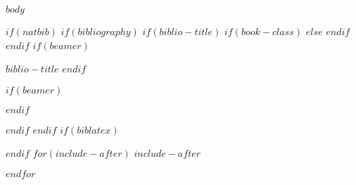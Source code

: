 \documentclass[$if(fontsize)$$fontsize$,$endif$$if(lang)$$babel-lang$,$endif$$if(papersize)$$papersize$paper,$endif$$if(beamer)$ignorenonframetext,$if(handout)$handout,$endif$$if(aspectratio)$aspectratio=$aspectratio$,$endif$$endif$$for(classoption)$$classoption$$sep$,$endfor$]{$documentclass$}
\newif\ifbibliography
\begin{document}
$body$

$if(natbib)$
$if(bibliography)$
$if(biblio-title)$
$if(book-class)$
\renewcommand\bibname{$biblio-title$}
$else$
\renewcommand\refname{$biblio-title$}
$endif$
$endif$
$if(beamer)$
\begin{frame}[allowframebreaks]{$biblio-title$}
\bibliographytrue
$endif$

$if(beamer)$
\end{frame}
$endif$

$endif$
$endif$
$if(biblatex)$

$endif$
$for(include-after)$
$include-after$

$endfor$
\end{document}
